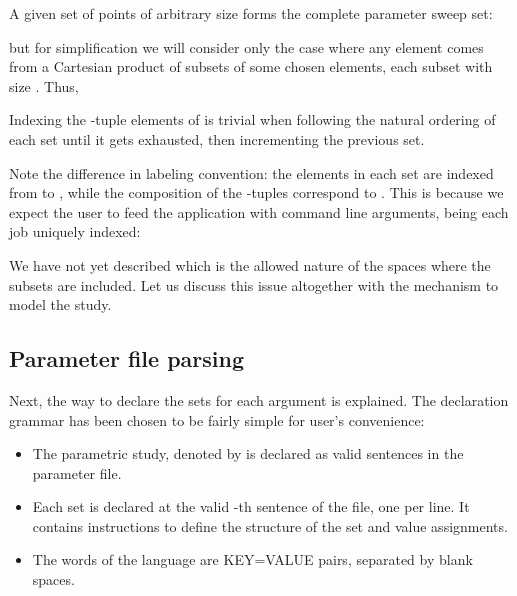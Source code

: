 \documentclass[12pt,a4paper]{article}
\begin{document}
A given set of points  of arbitrary size  forms the complete parameter sweep set:

but for simplification we will consider only the case where any element  comes from a Cartesian product of subsets  of some chosen elements, each subset with size . Thus,


Indexing the -tuple elements of  is trivial when following the natural ordering of each set  until it gets exhausted, then incrementing the previous set.

Note the difference in labeling convention: the elements in each set  are indexed from  to , while the composition of the -tuples correspond to . This is because we expect the user to feed the application with  command line arguments, being each job uniquely indexed:


We have not yet described which is the allowed nature of the spaces  where the subsets  are included. Let us discuss this issue altogether with the mechanism to model the study.

\subsection{Parameter file parsing}
Next, the way to declare the sets  for each argument is explained. The declaration grammar has been chosen to be fairly simple for user's convenience:
\begin{itemize}
\item The parametric study, denoted by  is declared as  valid sentences in the parameter file.
\item Each set  is declared at the valid -th sentence of the file, one per line. It contains instructions to define the structure of the set and value assignments.
\item The words of the language are KEY=VALUE pairs, separated by blank spaces.
\end{itemize}
\end{document}
